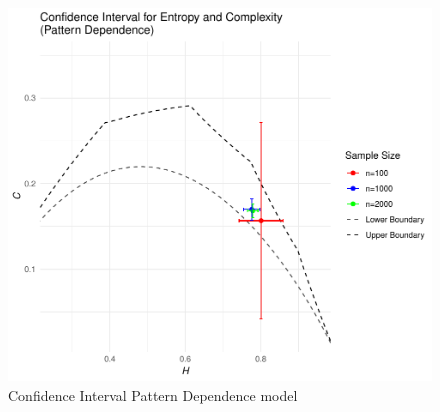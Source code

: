 \begin{figure}[H]
	\centering
	\includegraphics[width=0.7 \textwidth]{CI for pattern dependence}
	\caption{Confidence Interval Pattern Dependence model}
	\label{fig:CIDependence}
\end{figure}

